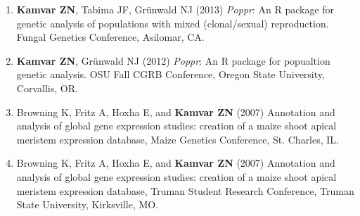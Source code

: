 \begin{enumerate}[leftmargin = 14pt]
	\vspace{3pt}

	\item \textbf{Kamvar ZN}, Tabima JF, Gr\"unwald NJ (2013) \textit{Poppr}: An
	R package for genetic analysis of populations with mixed (clonal/sexual)
	reproduction. Fungal Genetics Conference, Asilomar, CA.

	\vspace{3pt}

	\item \textbf{Kamvar ZN}, Gr\"unwald NJ (2012) \textit{Poppr}: An R package
	for popualtion genetic analysis. OSU Fall CGRB Conference, Oregon State
	University, Corvallis, OR.

	\vspace{3pt}

	\item Browning K, Fritz A, Hoxha E, and \textbf{Kamvar ZN} (2007) Annotation
	and analysis of global gene expression studies: creation of a maize shoot
	apical meristem expression database, Maize Genetics Conference, St. Charles,
	IL.

	\vspace{3pt}

	\item Browning K, Fritz A, Hoxha E, and \textbf{Kamvar ZN} (2007) Annotation
	and analysis of global gene expression studies: creation of a maize shoot
	apical meristem expression database, Truman Student Research Conference,
	Truman State University, Kirksville, MO.

\end{enumerate}








